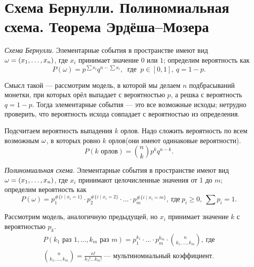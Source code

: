 \section{Схема Бернулли. Полиномиальная схема. Теорема Эрдёша–Мозера}

\begin{definition} \textit{Схема Бернулли}. Элементарные события в пространстве имеют вид $\omega = (x_1, \ldots, x_n)$, где $x_i$ принимает значение $0$ или $1$; определим вероятность как
    $$P(\omega) = p^{\sum x_i}q^{n - \sum x_i},\ \text{ где } \ p \in [0, 1], \ q = 1-p.$$ 
    \end{definition}
   
   Смысл такой --- рассмотрим модель, в которой мы делаем $n$ подбрасываний монетки, при которых орёл выпадает с вероятностью $p$, а решка с вероятность $q=1-p$. Тогда элементарные события --- это все возможные исходы; нетрудно проверить, что вероятность исхода совпадает с вероятностью из определения. 
   
   Подсчитаем вероятность выпадения $k$ орлов. Надо сложить вероятность по всем возможным $\omega$, в которых ровно $k$ орлов(они имеют одинаковые вероятности).
   $$P(k \text{ орлов}) = \binom{n}{k}p^kq^{n - k}.$$
   
    \begin{definition}\textit{Полиномиальная схема}.
   Элементарные события в пространстве имеют вид $\omega = (x_1, \ldots, x_n)$, где $x_i$ принимают целочисленные значения от 1 до $m$; определим вероятность как
   $$P(\omega) = p_1^{\#\{i\mid x_i = 1\}}\cdot p_2^{\#\{i\mid x_i = 2\}}\cdot\ldots\cdot p_m^{\#\{i\mid x_i = m\}},\ \text{где} \ p_i \ge 0, \ \sum p_i = 1.$$
    \end{definition}
   Рассмотрим модель, аналогичную предыдущей, но $x_i$ принимает значение $k$ с вероятностью $p_k$.
   \begin{gather*}
       P(k_1 \text{ раз } 1, \ldots, k_m \text{ раз } m) = p_1^{k_1}\cdot\ldots\cdot p_m^{k_m}\cdot \binom{n}{k_1,\ldots, k_m}, \ \text{где} \\ \binom{n}{k_1,\ldots, k_m} = \frac{n!}{k_1!\ldots k_m!} \ \text{--- мультиномиальный коэффициент.}
   \end{gather*}
    